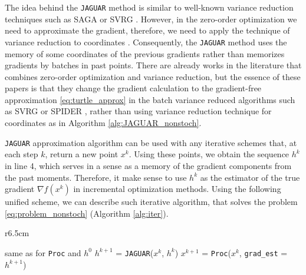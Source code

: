        The idea behind the \texttt{JAGUAR} method is similar to well-known variance reduction techniques such as SAGA \cite{defazio2014saga} or SVRG \cite{johnson2013accelerating}. 
        However, in the zero-order optimization we need to approximate the gradient, therefore, we need to apply the technique of variance reduction to coordinates \cite{hanzely2018sega}. Consequently, the \texttt{JAGUAR} method uses the memory of some coordinates of the previous gradients rather than memorizes gradients by batches in past points.
        There are already works in the literature that combines zero-order optimization and variance reduction, but the essence of these papers is that they change the gradient calculation to the gradient-free approximation \eqref{eq:turtle_approx} in the batch variance reduced  algorithms such as SVRG or SPIDER \cite{ji2019improved}, rather than using variance reduction technique for coordinates as in Algorithm \ref{alg:JAGUAR_nonstoch}. 


        
        \texttt{JAGUAR} approximation algorithm can be used with any iterative schemes that, at each step $k$, return a new point $x^k$. Using these points, we obtain the sequence $h^k$ in line 4, which serves in a sense as a memory of the gradient components from the past moments. Therefore, it make sense to use $h^k$ as the estimator of the true gradient $\nabla f(x^k)$ in incremental optimization methods. Using the following unified scheme, we can describe such iterative algorithm, that solves the problem \eqref{eq:problem_nonstoch} (Algorithm \ref{alg:iter}).


        \begin{wrapfigure}[7]{r}{6.5cm}
        \vspace{-0.65cm}
        \begin{minipage}{6.5cm}
        \vspace{-0.4cm}
        \begin{algorithm}[H]
    	\caption{Iterative algorithm using gradient estimator via \texttt{JAGUAR}}
    	\label{alg:iter}
        	\begin{algorithmic}[1]
                 same as for \texttt{Proc} and $h^0$
                    \State $h^{k+1}$ = \texttt{JAGUAR}($x^k$, $h^k$)
                    \State $x^{k+1}$ = \texttt{Proc}($x^k$, \texttt{grad\_est} = $h^{k+1}$)
                \EndFor
        	\end{algorithmic}
        \end{algorithm}
        \end{minipage}
        \end{wrapfigure}

